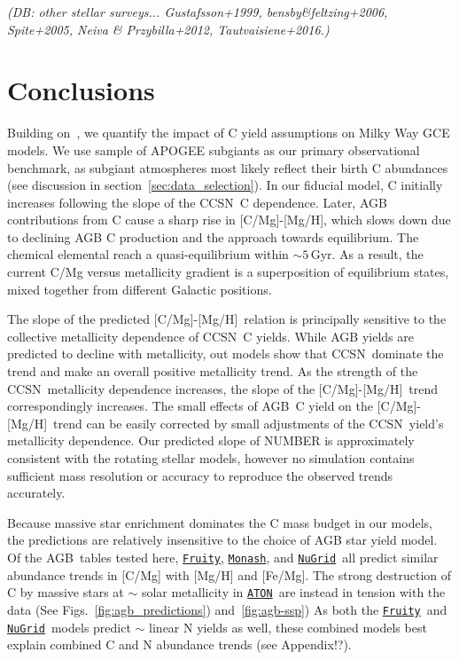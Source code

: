 \documentclass[fleqn,
usenatbib]{mnras}
\makeatletter
\newcommand{\fruity}{\texttt{\hyperlink{fruity}{Fruity}}}
\newcommand{\nugrid}{\texttt{\hyperlink{nugrid}{NuGrid}}}
\newcommand{\monash}{\texttt{\hyperlink{monash}{Monash}}}
\newcommand{\aton}{\texttt{\hyperlink{aton}{ATON}}}
\newcommand{\agb}{AGB}
\newcommand{\cc}{CCSN}
\newcommand{\caah}{[C/Mg]-[Mg/H]}
\newcommand{\about}[1]{${\sim} #1$}
\DeclareRobustCommand\citepos
  {\begingroup
   \let\NAT@nmfmt\NAT@posfmt%
   \NAT@swafalse\let\NAT@ctype\z@\NAT@partrue
   \@ifstar{\NAT@fulltrue\NAT@citetp}{\NAT@fullfalse\NAT@citetp}}
\let\NAT@orig@nmfmt\NAT@nmfmt
\def\NAT@posfmt#1{\NAT@orig@nmfmt{#1's}}
\newcommand{\dbnote}[1]{ {\color{Thistle} \textit{\small (DB: #1)}} }
\makeatother
\begin{document}
\dbnote{other stellar surveys...
Gustafsson+1999, bensby\&feltzing+2006, Spite+2005, Neiva \& Przybilla+2012, Tautvaisiene+2016.}



\section{Conclusions}\label{sec:conclusions}


Building on~\citet{james+23}, we quantify the impact of C yield assumptions on Milky Way GCE models. We use \citepos{jack} sample of APOGEE subgiants as our primary observational benchmark, as subgiant atmospheres most likely reflect their birth C abundances (see discussion in section~\ref{sec:data_selection}).
In our fiducial model, C initially increases following the slope of the \cc\ C dependence. Later, AGB contributions from C cause a sharp rise in \caah, which slows down due to declining AGB C production and the approach towards equilibrium. The chemical elemental reach a quasi-equilibrium within \about{5}\,Gyr. As a result, the current C/Mg versus metallicity gradient is a superposition of equilibrium states, mixed together from different Galactic positions.


The slope of the predicted \caah\ relation is principally sensitive to the collective metallicity dependence of \cc\ C yields.
While AGB yields are predicted to decline with metallicity, out models show that \cc\ dominate the trend and make an overall positive metallicity trend. 
As the strength of the \cc\ metallicity dependence increases, the slope of the \caah\ trend correspondingly increases. The small effects of \agb\ C yield on the \caah\ trend can be easily corrected by small adjustments of the \cc\ yield's metallicity dependence.
Our predicted slope of NUMBER is approximately consistent with the \citet{LC18} rotating stellar models, however no simulation contains sufficient mass resolution or accuracy to reproduce the observed trends accurately. 

Because massive star enrichment dominates the C mass budget in our models, the predictions are relatively insensitive to the choice of AGB star yield model.
Of the \agb\ tables tested here, \fruity, \monash, and \nugrid\ all predict similar abundance trends in [C/Mg] with [Mg/H] and [Fe/Mg]. The strong destruction of C by massive stars at \about{} solar metallicity   in \aton\ are instead in tension with the data (See Figs.~\ref{fig:agb_predictions})  and~\ref{fig:agb-ssp})
As both the \fruity\ and \nugrid\ models predict \about{} linear N yields as well, these combined models best explain combined C and N abundance trends (see Appendix!?).
\end{document}
